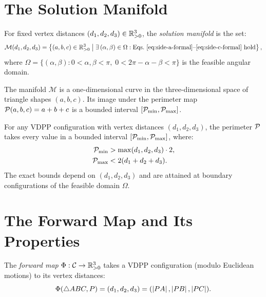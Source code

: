 \section{The Solution Manifold}

\begin{definition}
\label{def:solution-manifold}
For fixed vertex distances $(d_1, d_2, d_3) \in \mathbb{R}_{>0}^3$, the \emph{solution manifold} is the set:
\begin{equation}
\mathcal{M}(d_1, d_2, d_3) = \left\{ (a, b, c) \in \mathbb{R}_{>0}^3 \;\middle|\; \exists\, (\alpha, \beta) \in \Omega : \text{Eqs.~\eqref{eq:side-a-formal}--\eqref{eq:side-c-formal} hold} \right\},
\end{equation}
where $\Omega = \{(\alpha, \beta) : 0 < \alpha, \beta < \pi, \; 0 < 2\pi - \alpha - \beta < \pi\}$ is the feasible angular domain.
\end{definition}

The manifold $\mathcal{M}$ is a one-dimensional curve in the three-dimensional space of triangle shapes $(a, b, c)$. Its image under the perimeter map $\mathcal{P}(a, b, c) = a + b + c$ is a bounded interval $[\mathcal{P}_{\min}, \mathcal{P}_{\max}]$.

\begin{theorem}
\label{thm:perimeter-range}
For any VDPP configuration with vertex distances $(d_1, d_2, d_3)$, the perimeter $\mathcal{P}$ takes every value in a bounded interval $[\mathcal{P}_{\min}, \mathcal{P}_{\max}]$, where:
\begin{align}
\mathcal{P}_{\min} &> \max(d_1, d_2, d_3) \cdot 2, \\
\mathcal{P}_{\max} &< 2(d_1 + d_2 + d_3).
\end{align}
The exact bounds depend on $(d_1, d_2, d_3)$ and are attained at boundary configurations of the feasible domain $\Omega$.
\end{theorem}

\section{The Forward Map and Its Properties}

\begin{definition}
The \emph{forward map} $\Phi: \mathcal{C} \to \mathbb{R}_{>0}^3$ takes a VDPP configuration (modulo Euclidean motions) to its vertex distances:
\begin{equation}
\Phi(\triangle ABC, P) = (d_1, d_2, d_3) = (\left\lvert PA \right\rvert, \left\lvert PB \right\rvert, \left\lvert PC \right\rvert).
\end{equation}
\end{definition}

